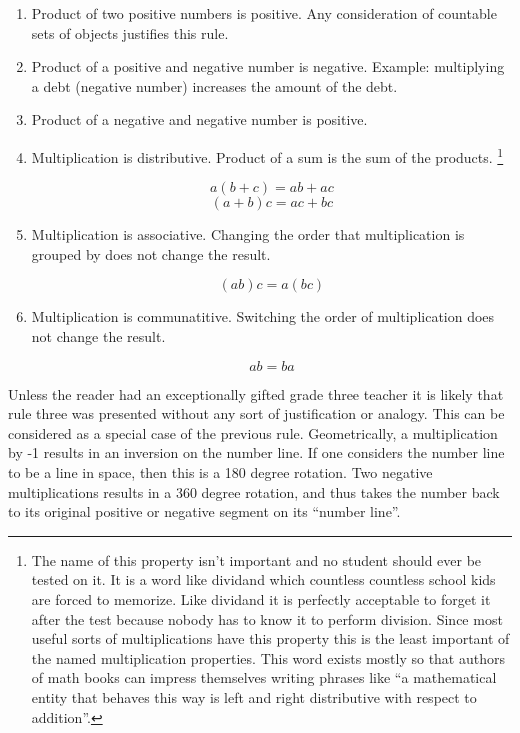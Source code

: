 \documentclass{article}      %
\begin{document}
\begin{enumerate}
\item Product of two positive numbers is positive.  Any consideration of countable sets of objects justifies this rule.

\item Product of a positive and negative number is negative.  Example: multiplying a debt (negative number) increases the amount of the debt.

\item Product of a negative and negative number is positive.

\item Multiplication is distributive.  Product of a sum is the sum of the products.
\footnote{The name of this property isn't important and no student should ever be tested on it.  It is a word like
dividand which countless countless school kids are forced to memorize.  Like dividand it is perfectly
acceptable to forget it after the test because nobody has to know it to perform division.
Since most useful sorts of multiplications have this property this is the least important
of the named multiplication properties.  This word exists mostly so that authors of math books can impress themselves writing phrases like ``a mathematical entity that behaves this way is 
left and right distributive with respect to addition''.
}

\[
a (b + c) = a b + a c
\]
\[
(a + b) c = a c + b c
\]

\item Multiplication is associative.  Changing the order that multiplication is grouped by does not change the result.

\[
(a b) c = a (b c)
\]

\item Multiplication is communatitive.  Switching the order of multiplication does not change the result.

\[
a b = b a
\]

\end{enumerate}

Unless the reader had an exceptionally gifted grade three teacher it is likely that rule three was presented without any sort of justification or analogy.  This can be considered as a special case of the previous rule.  Geometrically, a multiplication by -1 results in an inversion on the number line.  If one considers the number line to be a line in space, then this is a 180 degree rotation.  Two negative multiplications results in a 360 degree rotation, and thus takes the number back to its original positive or negative segment on its ``number line''.
\end{document}
